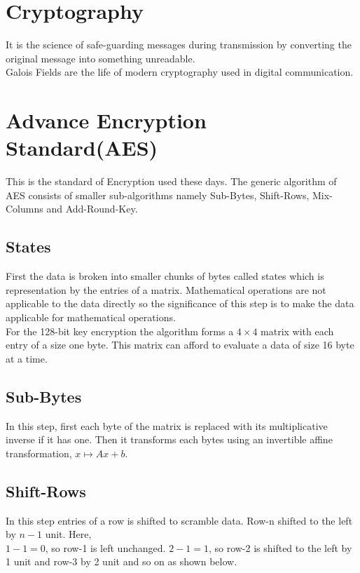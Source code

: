 \section{Cryptography}
It is the science of safe-guarding messages during transmission by converting the original message into something unreadable.\\
Galois Fields are the life of modern cryptography used in digital communication.

\section{Advance Encryption Standard(AES)}
This is the standard of Encryption used these days. The generic algorithm of AES consists of smaller sub-algorithms namely Sub-Bytes, Shift-Rows, Mix-Columns and Add-Round-Key.

\subsection{States}
First the data is broken into smaller chunks of bytes called states which is representation by the entries of a matrix.
Mathematical operations are not applicable to the data directly so the significance of this step is to make the data applicable for mathematical operations.\\
For the 128-bit key encryption the algorithm forms a \(4 \times 4\) matrix with each entry of a size one byte. This matrix can afford to evaluate a data of size 16 byte at a time.

\subsection{Sub-Bytes}
In this step, first each byte of the matrix is replaced with its multiplicative inverse if it has one. Then it transforms each bytes using an invertible affine transformation, \(x \mapsto Ax+b\).

\subsection{Shift-Rows}
In this step entries of a row is shifted to scramble data. Row-n shifted to the left by \(n-1\) unit. Here,\\
\(1-1=0\), so row-1 is left unchanged. \(2-1=1\), so row-2 is shifted to the left by 1 unit and row-3 by 2 unit and so on as shown below.

